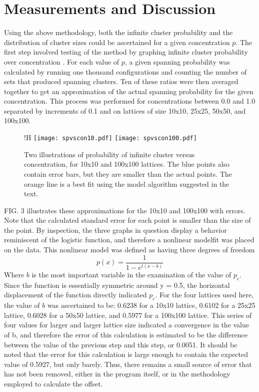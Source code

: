 \documentclass[twocolumn,prb,amsmath,amssymb,amsfonts]{revtex4}
\begin{document}
\section{Measurements and Discussion}
Using the above methodology, both the infinite cluster probability and the distribution of cluster sizes could be ascertained for a given concentration $p$. The first step involved testing of the method by graphing infinite cluster probability over concentration . For each value of $p$, a given spanning probability was calculated by running one thousand configurations and counting the number of sets that produced spanning clusters. Ten of these ratios were then averaged together to get an approximation of the actual spanning probability for the given concentration.
This process was performed for concentrations between 0.0 and 1.0 separated by increments of 0.1 and on lattices of size 10x10, 25x25, 50x50, and 100x100. 
\begin{figure}{!H}
\texttt{[image: spvscon10.pdf]}
\texttt{[image: spvscon100.pdf]}
\caption{Two illustrations of probability of infinite cluster versus concentration, for 10x10 and 100x100 lattices. The blue points also contain error bars, but they are smaller than the actual points. The orange line is a best fit using the model algorithm suggested in the text.}
\end{figure}
FIG. 3 illustrates these approximations for the 10x10 and 100x100 with errors. Note that the calculated standard error for each point is smaller than the size of the point. 
By inspection, the three graphs in question display a behavior reminiscent of the logistic function, and therefore a nonlinear modelfit was placed on the data. This nonlinear model was defined as having three degrees of freedom
\begin{equation}
  p(x) = \frac{1}{1-e^{t(x-b)}}
\end{equation}
Where $b$ is the most important variable in the examination of the value of $p_c$. Since the function is essentially symmetric around y = 0.5, the horizontal displacement of the function directly indicated $p_c$. For the four lattices used here, the value of $b$ was ascertained to be: 0.6238 for a 10x10 lattice, 0.6102 for a 25x25 lattice, 0.6028 for a 50x50 lattice, and 0.5977 for a 100x100 lattice. This series of four values for larger and larger lattice size indicated a convergence in the value of b, and therefore the error of this calculation is estimated to be the difference between the value of the previous step and this step, or 0.0051. It should be noted that the error for this calculation is large enough to contain the expected value of 0.5927, but only barely. Thus, there remains a small source of error that has not been removed, either in the program itself, or in the methodology employed to calculate the offset.
\end{document}
